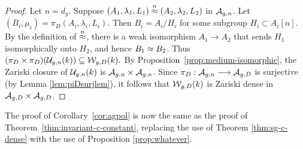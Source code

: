 \documentclass{amsart}
\begin{document}
\begin{proof}
Let $n = d_g$. %
%  
Suppose $(A_1, \lambda_1, L_1) \stackrel{n}{\approx} (A_2, \lambda_2, L_2)$ in $\mathcal{A}_{g,n}$. Let $(B_i, \mu_i) = \pi_D(A_i, \lambda_i, L_i)$. Then $B_i = A_i/H_i$ for some subgroup $H_i \subset A_i[n]$. By the definition of $\stackrel{n}{\approx}$, there is a weak isomorphism $A_1 \to A_2$ that sends $H_1$ isomorphically onto $H_2$, and hence %
  $B_1 \approx B_2$. Thus
    $(\pi_D\times\pi_D)(\mathcal{U}_{g,n}(k)) \subseteq \mathcal{W}_{g,D}(k).$
By Proposition~\ref{prop:medium-isomorphic}, the Zariski closure of $\mathcal{U}_{g,n}(k)$ is $\mathcal{A}_{g,n} \times \mathcal{A}_{g,n}$. 
  Since $\pi_D:\mathcal{A}_{g,n} \longrightarrow \mathcal{A}_{g,{D}}$ is surjective (by Lemma \ref{lem:piDsurjlem}), it follows that $\mathcal{W}_{g,D}(k)$ is Zariski dense in $\mathcal{A}_{g,{D}} \times \mathcal{A}_{g,{D}}$.
\end{proof}
The proof of Corollary~\ref{cor:agpol} is now the same as the proof of Theorem~\ref{thm:invariant-c-constant}, replacing the use of Theorem \ref{thm:sg-c-dense} with the use of Proposition \ref{prop:whatever}.



\end{document}
